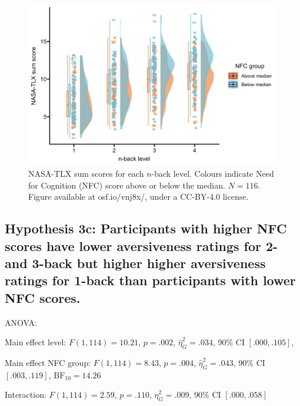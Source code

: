 \documentclass[
  man,floatsintext]{apa6}
\begin{document}
\begin{figure}[H]
\includegraphics[width=\textwidth]{Figures/h3b-plot} \caption{NASA-TLX sum scores for each $n$-back level. Colours indicate Need for Cognition (NFC) score above or below the median. $N=116$. Figure available at osf.io/vnj8x/, under a CC-BY-4.0 license.}\label{fig:h3b-plot}
\end{figure}

\newpage

\hypertarget{hypothesis-3c-participants-with-higher-nfc-scores-have-lower-aversiveness-ratings-for-2--and-3-back-but-higher-higher-aversiveness-ratings-for-1-back-than-participants-with-lower-nfc-scores.}{%
\subsection{Hypothesis 3c: Participants with higher NFC scores have lower aversiveness ratings for 2- and 3-back but higher higher aversiveness ratings for 1-back than participants with lower NFC scores.}\label{hypothesis-3c-participants-with-higher-nfc-scores-have-lower-aversiveness-ratings-for-2--and-3-back-but-higher-higher-aversiveness-ratings-for-1-back-than-participants-with-lower-nfc-scores.}}

ANOVA:

Main effect level: \(F(1, 114) = 10.21\), \(p = .002\), \(\hat{\eta}^2_G = .034\), 90\% CI \([.000, .105]\),

Main effect NFC group: \(F(1, 114) = 8.43\), \(p = .004\), \(\hat{\eta}^2_G = .043\), 90\% CI \([.003, .119]\), \(\mathrm{BF}_{\textrm{10}} = 14.26\)

Interaction: \(F(1, 114) = 2.59\), \(p = .110\), \(\hat{\eta}^2_G = .009\), 90\% CI \([.000, .058]\)
\end{document}
